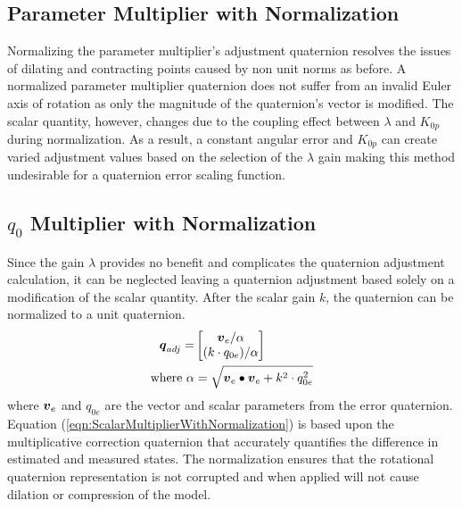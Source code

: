 \subsection{Parameter Multiplier with Normalization}
\label{subsec:ParameterMultiplierwithNormalization}

Normalizing the parameter multiplier's adjustment quaternion resolves the issues of dilating and contracting points caused by non unit norms as before.  A normalized parameter multiplier quaternion does not suffer from an invalid Euler axis of rotation as only the magnitude of the quaternion's vector is modified.  The scalar quantity, however, changes due to the coupling effect between $\lambda$ and $K_{0p}$ during normalization.  As a result, a constant angular error and $K_{0p}$ can create varied adjustment values based on the selection of the $\lambda$ gain making this method undesirable for a quaternion error scaling function.

\subsection{$q_0$ Multiplier with Normalization}
\label{subsec:q0MultiplierWithNormalization}

Since the gain $\lambda$ provides no benefit and complicates the quaternion adjustment calculation, it can be neglected leaving a quaternion adjustment based solely on a modification of the scalar quantity.  After the scalar gain $k$, the quaternion can be normalized to a unit quaternion.
\begin{equation}
  \begin{aligned}
  \boldsymbol{q}_{adj} = & \begin{bmatrix} \boldsymbol{v}_e / \alpha \\ ( k \cdot q_{0e} )  / \alpha \end{bmatrix} \\
  \text{where } \alpha & = \sqrt{\boldsymbol{v}_e \bullet \boldsymbol{v}_e + k^2 \cdot q_{0e}^2}
  \end{aligned}
  \label{eqn:ScalarMultiplierWithNormalization}
\end{equation}
where $\boldsymbol{v}_e$ and $q_{0e}$ are the vector and scalar parameters from the error quaternion.  Equation (\ref{eqn:ScalarMultiplierWithNormalization}) is based upon the multiplicative correction quaternion that accurately quantifies the difference in estimated and measured states.  The normalization ensures that the rotational quaternion representation is not corrupted and when applied will not cause dilation or compression of the model.

